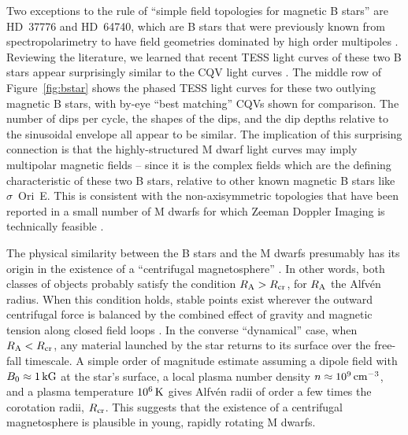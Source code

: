 \documentclass[11pt,twocolumn,tighten]{aastex63}
\begin{document}
Two exceptions to the rule of ``simple field topologies for magnetic B
stars'' are HD~37776 and HD~64740, which are B stars that were
previously known from spectropolarimetry to have field geometries
dominated by high order multipoles \citep{2011ApJ...726...24K}.
Reviewing the literature, we learned that recent TESS light curves of
these two B stars appear surprisingly similar to the CQV light curves
\citep{2020pase.conf...46M}.  The middle row of Figure~\ref{fig:bstar}
shows the phased TESS light curves for these two outlying magnetic B
stars, with by-eye ``best matching'' CQVs shown for comparison.  The
number of dips per cycle, the shapes of the dips, and the dip depths
relative to the sinusoidal envelope all appear to be similar.  The
implication of this surprising connection is that the
highly-structured M dwarf light curves may imply multipolar magnetic
fields -- since it is the complex fields which are the defining
characteristic of these two B stars, relative to other known magnetic
B stars like $\sigma$~Ori~E.  This is consistent with the
non-axisymmetric topologies that have been reported in a small number
of M dwarfs for which Zeeman Doppler Imaging is technically feasible
\citep[see the review by][]{2021A&ARv..29....1K}.

The physical similarity between the B stars and the M dwarfs
presumably has its origin in the existence of a ``centrifugal
magnetosphere'' \citep[see][]{2013MNRAS.429..398P}.  In other words,
both classes of objects probably satisfy the condition $R_{\rm A} >
R_{\rm cr}$, for $R_{\rm A}$ the Alfv\'en radius.  When this condition
holds, stable points exist wherever the outward centrifugal force is
balanced by the combined effect of gravity and magnetic tension along
closed field loops \citep{1985Ap&SS.116..285N}.  In the converse
``dynamical'' case, when  $R_{\rm A} < R_{\rm cr}$, any material
launched by the star returns to its surface over the free-fall
timescale.  A simple order of magnitude estimate assuming a dipole
field with $B_0\approx1\,{\rm kG}$ at the star's surface, a local
plasma number density $n\approx10^9\,{\rm cm^{-3}}$, and a plasma
temperature $10^6\,{\rm K}$ gives Alfv\'en radii of order a few times
the corotation radii, $R_{\rm cr}$.  This suggests that the existence
of a centrifugal magnetosphere is plausible in young, rapidly rotating
M dwarfs.


\end{document}
